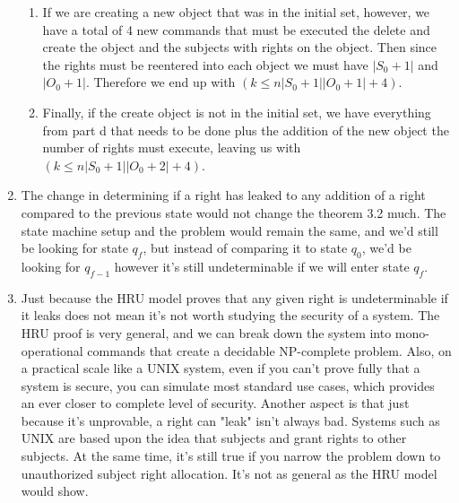 \documentclass[journal,onecolumn]{IEEEtran}
\begin{document}
\begin{enumerate}
\begin{enumerate}
    \item If we are creating a new object that was in the initial set, however, we have a total of 4 new commands that must be executed the delete and create the object and the subjects with rights on the object. Then since the rights must be reentered into each object we must have \(|S_0 + 1|\) and \(|O_0 + 1|\). Therefore we end up with \((k \leq n|S_0 + 1||O_0 + 1| + 4)\).
    \item Finally, if the create object is not in the initial set, we have everything from part d that needs to be done plus the addition of the new object the number of rights must execute, leaving us with \((k \leq n|S_0 + 1||O_0 + 2| + 4)\).
  \end{enumerate}
  \item The change in determining if a right has leaked to any addition of a right compared to the previous state would not change the theorem 3.2 much. The state machine setup and the problem would remain the same, and we'd still be looking for state \(q_f\), but instead of comparing it to state \(q_0\), we'd be looking for \(q_{f-1}\) however it's still undeterminable if we will enter state \(q_f\). 
  \item Just because the HRU model proves that any given right is undeterminable if it leaks does not mean it's not worth studying the security of a system. The HRU proof is very general, and we can break down the system into mono-operational commands that create a decidable NP-complete problem. Also, on a practical scale like a UNIX system, even if you can't prove fully that a system is secure, you can simulate most standard use cases, which provides an ever closer to complete level of security. Another aspect is that just because it's unprovable, a right can "leak" isn't always bad. Systems such as UNIX are based upon the idea that subjects and grant rights to other subjects. At the same time, it's still true if you narrow the problem down to unauthorized subject right allocation. It's not as general as the HRU model would show. 
\end{enumerate}


\end{document}
